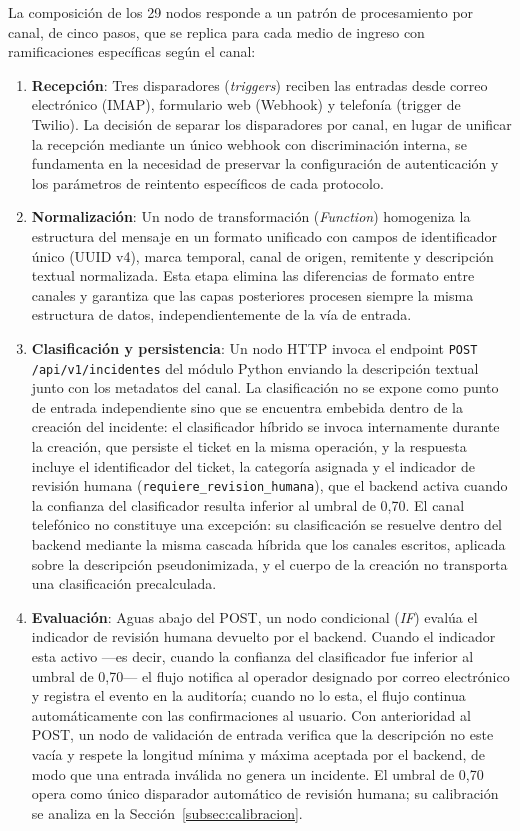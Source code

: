 La composición de los 29 nodos responde a un patrón de procesamiento por canal, de cinco pasos, que se replica para cada medio de ingreso con ramificaciones específicas según el canal:

\begin{enumerate}[leftmargin=*]
  \item \textbf{Recepción}: Tres disparadores (\emph{triggers}) reciben las entradas desde correo electrónico (IMAP), formulario web (Webhook) y telefonía (trigger de Twilio). La decisión de separar los disparadores por canal, en lugar de unificar la recepción mediante un único webhook con discriminación interna, se fundamenta en la necesidad de preservar la configuración de autenticación y los parámetros de reintento específicos de cada protocolo.
  \item \textbf{Normalización}: Un nodo de transformación (\emph{Function}) homogeniza la estructura del mensaje en un formato unificado \parencite{Hohpe2003_eip} con campos de identificador único (UUID v4), marca temporal, canal de origen, remitente y descripción textual normalizada. Esta etapa elimina las diferencias de formato entre canales y garantiza que las capas posteriores procesen siempre la misma estructura de datos, independientemente de la vía de entrada.
  \item \textbf{Clasificación y persistencia}: Un nodo HTTP invoca el endpoint \texttt{POST /api/v1/incidentes} del módulo Python enviando la descripción textual junto con los metadatos del canal. La clasificación no se expone como punto de entrada independiente sino que se encuentra embebida dentro de la creación del incidente: el clasificador híbrido se invoca internamente durante la creación, que persiste el ticket en la misma operación, y la respuesta incluye el identificador del ticket, la categoría asignada y el indicador de revisión humana (\texttt{requiere\_revision\_humana}), que el backend activa cuando la confianza del clasificador resulta inferior al umbral de 0,70. El canal telefónico no constituye una excepción: su clasificación se resuelve dentro del backend mediante la misma cascada híbrida que los canales escritos, aplicada sobre la descripción pseudonimizada, y el cuerpo de la creación no transporta una clasificación precalculada.
  \item \textbf{Evaluación}: Aguas abajo del POST, un nodo condicional (\emph{IF}) evalúa el indicador de revisión humana devuelto por el backend. Cuando el indicador esta activo ---es decir, cuando la confianza del clasificador fue inferior al umbral de 0,70--- el flujo notifica al operador designado por correo electrónico y registra el evento en la auditoría; cuando no lo esta, el flujo continua automáticamente con las confirmaciones al usuario. Con anterioridad al POST, un nodo de validación de entrada verifica que la descripción no este vacía y respete la longitud mínima y máxima aceptada por el backend, de modo que una entrada inválida no genera un incidente. El umbral de 0,70 opera como único disparador automático de revisión humana; su calibración se analiza en la Sección~\ref{subsec:calibracion}.

\end{enumerate}
